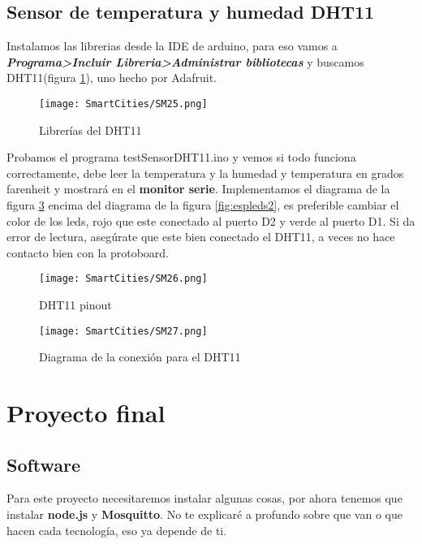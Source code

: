 \documentclass[
	12pt, %
	fleqn, %
	a4paper, %
	oneside, %
]{LegrandOrangeBook}
\begin{document}
\section{Sensor de temperatura y humedad DHT11}
Instalamos las librerias desde la IDE de arduino, para eso vamos a \textbf{\textit{Programa>Incluir Libreria>Administrar bibliotecas}} y buscamos DHT11(figura \ref{fig:dht11lib}), uno hecho por Adafruit.\\
\begin{figure}[H]
\centering\texttt{[image: SmartCities/SM25.png]}
\caption{Librerías del DHT11}
\label{fig:dht11lib}
\end{figure}
Probamos el programa testSensorDHT11.ino y vemos si todo funciona correctamente, debe leer la temperatura y la humedad y temperatura en grados farenheit y mostrará en el \textbf{monitor serie}.
Implementamos el diagrama de la figura \ref{fig:dhtfirst} encima del diagrama de la figura \ref{fig:espleds2}, es preferible cambiar el color de los leds, rojo que este conectado al puerto D2 y verde al puerto D1.
Si da error de lectura, asegúrate que este bien conectado el DHT11, a veces no hace contacto bien con la protoboard.
\begin{figure}[H]
\centering\texttt{[image: SmartCities/SM26.png]}
\caption{DHT11 pinout}
\label{fig:dhtpinout}
\end{figure}
\begin{figure}[H]
\centering\texttt{[image: SmartCities/SM27.png]}
\caption{Diagrama de la conexión para el DHT11}
\label{fig:dhtfirst}
\end{figure}
\chapter{Proyecto final}
\section{Software}
Para este proyecto necesitaremos instalar algunas cosas, por ahora tenemos que instalar \textbf{node.js} y \textbf{Mosquitto}. No te explicaré a profundo sobre que van o que hacen cada tecnología, eso ya depende de ti. 
\end{document}
